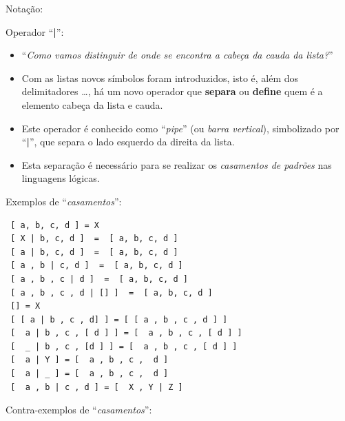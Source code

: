 \begin{frame}[fragile, allowframebreaks=0.9]
\begin{block}{Notação:}
\end{block}


\framebreak
\begin{block}{Operador ``{\bf |}'':}

\begin{itemize}
  \item ``{\em  Como vamos distinguir de onde se encontra
a cabeça  da cauda da lista?}'' 

  \item Com as listas novos símbolos foram introduzidos, 
isto é, além dos delimitadores \lbrack \ldots \rbrack, há um 
 novo operador que \textbf{separa} 
 ou \textbf{define} quem é a elemento cabeça da lista e  cauda. 

  \item Este operador é conhecido como
 ``{\em pipe}'' (ou \textit{barra vertical}), simbolizado por ``{\bf |}'', que 
 separa  o lado esquerdo  da direita da lista. 
 
  \item  Esta separação  é necessário para se realizar os 
  \textit{casamentos de padrões} nas linguagens lógicas.

\end{itemize}
\end{block}

\framebreak
\begin{block}{Exemplos de ``{\em casamentos}'':}

\begin{small}
\begin{verbatim}
 [ a, b, c, d ] = X
 [ X | b, c, d ]  =  [ a, b, c, d ]
 [ a | b, c, d ]  =  [ a, b, c, d ]
 [ a , b | c, d ]  =  [ a, b, c, d ]
 [ a , b , c | d ]  =  [ a, b, c, d ]
 [ a , b , c , d | [] ]  =  [ a, b, c, d ]
 [] = X
 [ [ a | b , c , d] ] = [ [ a , b , c , d ] ]
 [  a | b , c , [ d ] ] = [  a , b , c , [ d ] ]
 [  _ | b , c , [d ] ] = [  a , b , c , [ d ] ]
 [  a | Y ] = [  a , b , c ,  d ]
 [  a | _ ] = [  a , b , c ,  d ]
 [  a , b | c , d ] = [  X , Y | Z ]
 \end{verbatim}
\end{small}
\end{block}

\framebreak
\begin{block}{Contra-exemplos de ``{\em casamentos}'':}


\end{block}
\end{frame}
